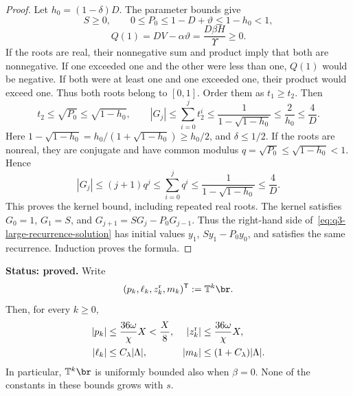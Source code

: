 \begin{proof}
Let \(h_0=(1-\delta)D\). The parameter bounds give
\[
S\ge0,\qquad
0\le P_0\le1-D+\vartheta\le1-h_0<1,
\]
\[
Q(1)=DV-\alpha\vartheta
=\frac{D\beta H}{\Upsilon}\ge0.
\]
If the roots are real, their nonnegative sum and product imply that
both are nonnegative. If one exceeded one and the other were less
than one, \(Q(1)\) would be negative. If both were at least one and
one exceeded one, their product would exceed one. Thus both roots
belong to \([0,1]\). Order them as \(t_1\ge t_2\). Then
\[
t_2\le\sqrt{P_0}\le\sqrt{1-h_0},
\qquad
|G_j|\le\sum_{i=0}^jt_2^i
\le\frac{1}{1-\sqrt{1-h_0}}
\le\frac{2}{h_0}\le\frac4D.
\]
Here \(1-\sqrt{1-h_0}=h_0/(1+\sqrt{1-h_0})\ge h_0/2\),
and \(\delta\le1/2\).
If the roots are nonreal, they are conjugate and have common modulus
\(q=\sqrt{P_0}\le\sqrt{1-h_0}<1\). Hence
\[
|G_j|\le(j+1)q^j
\le\sum_{i=0}^jq^i
\le\frac{1}{1-\sqrt{1-h_0}}\le\frac4D.
\]
This proves the kernel bound, including repeated real roots.
The kernel satisfies \(G_0=1\), \(G_1=S\), and
\(G_{j+1}=SG_j-P_0G_{j-1}\).
Thus the right-hand side of~\eqref{eq:q3-large-recurrence-solution}
has initial values \(y_1\), \(Sy_1-P_0y_0\), and satisfies the
same recurrence. Induction proves the formula.
\end{proof}

\begin{lemma}
\label{lem:q3-large-remainder}
\textbf{Status: proved.}
Write
\[
(p_k,\ell_k,z_k^{\rm r},m_k)^{\mathsf{T}}:=\mathbb{T}^k\br.
\]
Then, for every \(k\ge0\),
\begin{equation}
\begin{aligned}
|p_k|&\le\frac{36\omega}{\chi}X<\frac X8,
&|z_k^{\rm r}|&\le\frac{36\omega}{\chi}X,\\
|\ell_k|&\le C_\lambda|\Lambda|,
&|m_k|&\le(1+C_\lambda)|\Lambda|.
\end{aligned}
\label{eq:q3-large-remainder-bounds}
\end{equation}
In particular, \(\mathbb{T}^k\br\) is uniformly bounded also when
\(\beta=0\). None of the constants in these bounds grows with \(s\).
\end{lemma}

